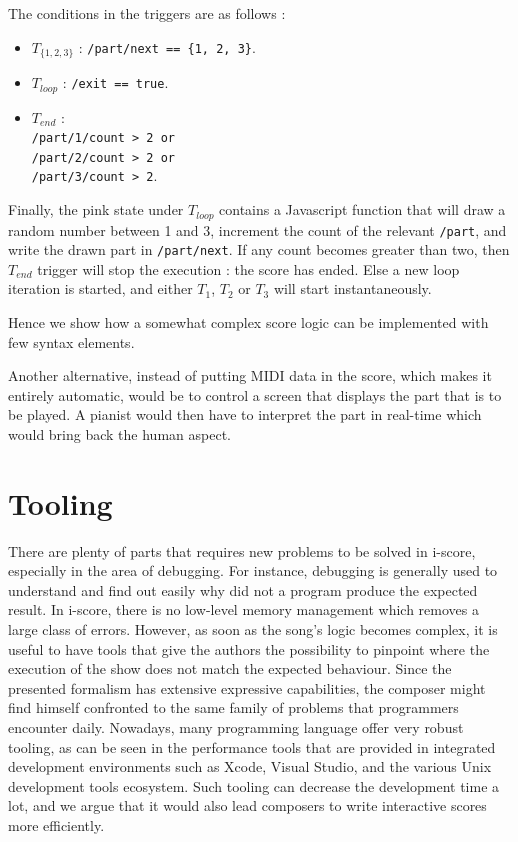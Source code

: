 \documentclass{article}
\begin{document}
The conditions in the triggers are as follows : 
\begin{itemize}
\item  $T_{\{1, 2, 3\}}$ : \lstinline|/part/next == {1, 2, 3}|.
\item $T_{loop}$ : \lstinline{/exit == true}.
\item $T_{end}$ : ~\\
\lstinline{/part/1/count > 2 or} \\
\lstinline{/part/2/count > 2 or} \\
\lstinline{/part/3/count > 2}.
\end{itemize}

Finally, the pink state under $T_{loop}$ contains a Javascript function 
that will draw a random number between 1 and 3, 
increment the count of the relevant \verb|/part|, 
and write the drawn part in \verb|/part/next|.
If any count becomes greater than two, then $T_{end}$
trigger will stop the execution : the score has ended. 
Else a new loop iteration is started, and either 
$T_1$, $T_2$ or $T_3$ will start instantaneously.

Hence we show how a somewhat complex score logic 
can be implemented with few syntax elements.

Another alternative, instead of putting MIDI data in the score,
which makes it entirely automatic,  
would be to control a screen that displays the part that is 
to be played.
A pianist would then have to interpret the part 
in real-time which would bring back the human aspect.

\section{Tooling}
There are plenty of parts that requires new problems to be solved in i-score, especially in the area of debugging. 
For instance, debugging is generally used to understand and find out easily why did not a program produce the expected result.
In i-score, there is no low-level memory management which removes a large class of errors.
However, as soon as the song's logic becomes complex, it is useful to have tools that give the authors the possibility to pinpoint where the execution of the show does not match the expected behaviour.
Since the presented formalism has extensive expressive capabilities, the composer might find himself confronted to the same family of problems that programmers encounter daily.
Nowadays, many programming language offer very robust tooling, as can be seen in the performance tools that are provided in integrated development environments such as Xcode, Visual Studio, and the various Unix development tools ecosystem\cite{spinellis2014software}.
Such tooling can decrease the development time a lot, and we argue that it would also lead composers to write interactive scores more efficiently.
\end{document}
